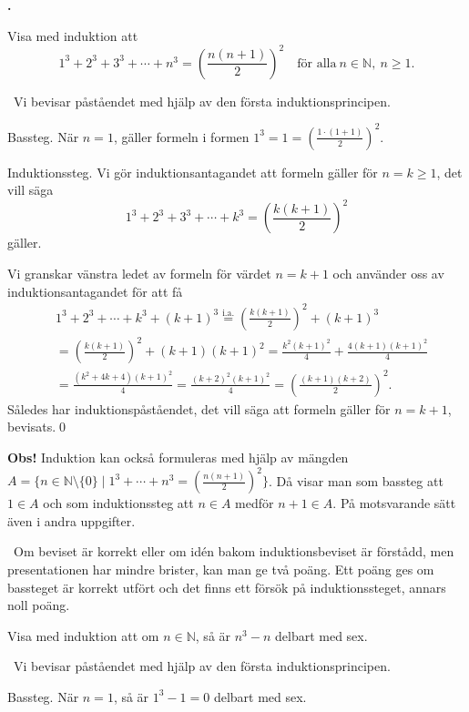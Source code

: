 \documentclass[11pt,a4paper,oneside,notitlepage,final]{article}
\newcommand{\N}{\mathbb{N}}
\newcounter{harjnro}
\newenvironment{harjlist}
  {\begin{list}{\kor{\arabic{harjnro}.}}
    {\usecounter{harjnro}
      \setlength{\labelwidth}{0em}
      \setlength{\labelsep}{0.4em}
      \setlength{\leftmargin}{0pt}
      \setlength{\parsep}{5pt}
      \setlength{\itemindent}{0.4em}
      \setlength{\topsep}{0.5\parskip}
      \setlength{\itemsep}{0.75\parskip}
    }
  }
  {\end{list}}
\newcommand{\kor}[1]{\textbf{#1}}
\begin{document}
\begin{harjlist}

\item[1.] Visa med induktion att  
\[
1^3+2^3+3^3+\cdots+n^3=\left(\frac{n(n+1)}{2}\right)^2\quad\text{för alla}\ n\in\N,\ n\geqslant 1.
\]

\vspace{0.4cm}
\losning \
Vi bevisar påståendet med hjälp av den första induktionsprincipen.

Bassteg. När $n=1$, gäller formeln i formen $\displaystyle 1^3=1=\left(\frac{1\cdot(1+1)}{2}\right)^2$.

Induktionssteg. Vi gör induktionsantagandet att formeln gäller för $n=k \ge 1$, det vill säga
\[
1^3+2^3+3^3+\cdots+k^3=\left(\frac{k(k+1)}{2}\right)^2
\]
gäller.

Vi granskar vänstra ledet av formeln för värdet $n = k+1$ och använder oss av induktionsantagandet för att få
\begin{align*}
&1^3+2^3+\cdots+k^3+(k+1)^3\overset{\text{i.a.}}{=}\left(\frac{k(k+1)}{2}\right)^2+(k+1)^3\\
&=\left(\frac{k(k+1)}{2}\right)^2+(k+1)(k+1)^2=\frac{k^2(k+1)^2}{4}+\frac{4(k+1)(k+1)^2}{4}\\
&=\frac{(k^2+4k+4)(k+1)^2}{4}=\frac{(k+2)^2(k+1)^2}{4}=\left(\frac{(k+1)(k+2)}{2}\right)^2.
\end{align*}
Således har induktionspåståendet, det vill säga att formeln gäller för $n=k+1$, bevisats.\qed

\textbf{Obs!} Induktion kan också formuleras med hjälp av mängden $A=\{n\in \N \setminus\{0\}\mid 1^3+\cdots+n^3=(\frac{n(n+1)}{2})^2\}$. Då visar man som bassteg att $1\in A$ och som induktionssteg att $n\in A$ medför $n+1\in A$. På motsvarande sätt även i andra uppgifter.

\bedomning \
Om beviset är korrekt eller om idén bakom induktionsbeviset är förstådd, men presentationen har mindre brister, kan man ge två poäng. Ett poäng ges om bassteget är korrekt utfört och det finns ett försök på induktionssteget, annars noll poäng.

\item[2.] Visa med induktion att om $n\in\N$, så är $n^3-n$ delbart med sex.

\vspace{0.4cm}
\losning \
Vi bevisar påståendet med hjälp av den första induktionsprincipen.

Bassteg. När $n=1$, så är $1^3-1=0$ delbart med sex.


\end{harjlist}
\end{document}
